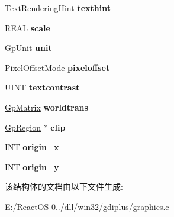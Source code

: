 \begin{DoxyCompactItemize}
Text\+Rendering\+Hint {\bfseries texthint}
\item 
\mbox{\label{struct___graphics_container_item_a73276810a4ca96e0e1aadbfcc81300cd}} 
R\+E\+AL {\bfseries scale}
\item 
\mbox{\label{struct___graphics_container_item_a5dde75d737f427a252e0afbc8bfce0c8}} 
Gp\+Unit {\bfseries unit}
\item 
\mbox{\label{struct___graphics_container_item_a36493919cda13af631842826db618d2d}} 
Pixel\+Offset\+Mode {\bfseries pixeloffset}
\item 
\mbox{\label{struct___graphics_container_item_a521a250c0577aafccd6a6eafb9edb55d}} 
U\+I\+NT {\bfseries textcontrast}
\item 
\mbox{\label{struct___graphics_container_item_a67a302d9734785622d3a0f22acfece2c}} 
\hyperlink{struct_gp_matrix}{Gp\+Matrix} {\bfseries worldtrans}
\item 
\mbox{\label{struct___graphics_container_item_ae0f33aa46767ea8b8e526003d8b9d3e1}} 
\hyperlink{struct_gp_region}{Gp\+Region} $\ast$ {\bfseries clip}
\item 
\mbox{\label{struct___graphics_container_item_a88f10308e73e374df3d8e3fffdf0d6bd}} 
I\+NT {\bfseries origin\+\_\+x}
\item 
\mbox{\label{struct___graphics_container_item_a1cd3cc9920bf332aab8a2580e3718145}} 
I\+NT {\bfseries origin\+\_\+y}
\end{DoxyCompactItemize}


该结构体的文档由以下文件生成\+:\begin{DoxyCompactItemize}
\item 
E\+:/\+React\+O\+S-\/0../dll/win32/gdiplus/graphics.\+c\end{DoxyCompactItemize}

